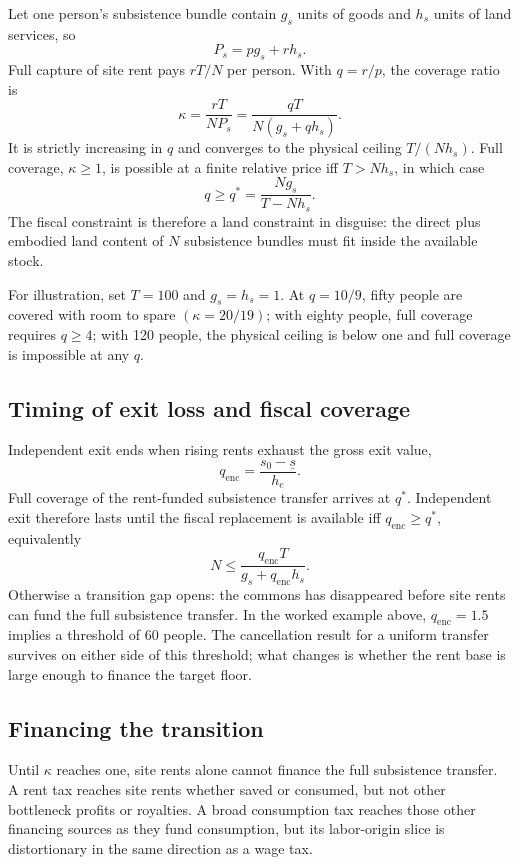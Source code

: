 \documentclass[12pt]{article}
\theoremstyle{plain}
\begin{document}
Let one person's subsistence bundle contain $g_s$ units of goods and $h_s$ units of land services, so
\[
P_s=pg_s+rh_s.
\]
Full capture of site rent pays $rT/N$ per person. With $q=r/p$, the coverage ratio is
\[
\kappa=\frac{rT}{NP_s}
      =\frac{qT}{N(g_s+qh_s)}.
\]
It is strictly increasing in $q$ and converges to the physical ceiling $T/(Nh_s)$. Full coverage, $\kappa\ge1$, is possible at a finite relative price iff $T>Nh_s$, in which case
\[
q\ge q^*=\frac{Ng_s}{T-Nh_s}.
\]
The fiscal constraint is therefore a land constraint in disguise: the direct plus embodied land content of $N$ subsistence bundles must fit inside the available stock. 

For illustration, set $T=100$ and $g_s=h_s=1$. At $q=10/9$, fifty people are covered with room to spare $(\kappa=20/19)$; with eighty people, full coverage requires $q\ge4$; with 120 people, the physical ceiling is below one and full coverage is impossible at any $q$.

\subsection{Timing of exit loss and fiscal coverage}\label{app:race}

Independent exit ends when rising rents exhaust the gross exit value,
\[
q_{\mathrm{enc}}=\frac{s_0-\underline{s}}{h_e}.
\]
Full coverage of the rent-funded subsistence transfer arrives at $q^*$. Independent exit therefore lasts until the fiscal replacement is available iff $q_{\mathrm{enc}}\ge q^*$, equivalently
\[
N\le \frac{q_{\mathrm{enc}}T}{g_s+q_{\mathrm{enc}}h_s}.
\]
Otherwise a transition gap opens: the commons has disappeared before site rents can fund the full subsistence transfer. In the worked example above, $q_{\mathrm{enc}}=1.5$ implies a threshold of 60 people. The cancellation result for a uniform transfer survives on either side of this threshold; what changes is whether the rent base is large enough to finance the target floor.

\subsection{Financing the transition}\label{app:mix}

Until $\kappa$ reaches one, site rents alone cannot finance the full subsistence transfer. A rent tax reaches site rents whether saved or consumed, but not other bottleneck profits or royalties. A broad consumption tax reaches those other financing sources as they fund consumption, but its labor-origin slice is distortionary in the same direction as a wage tax.
\end{document}
